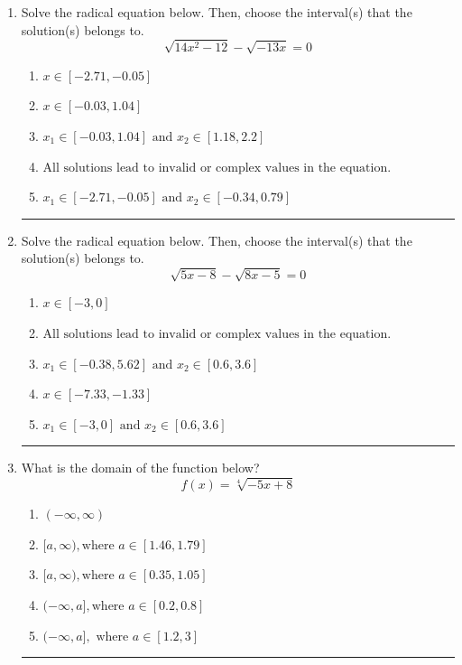 \documentclass[14pt]{extbook}
\newcommand{\litem}[1]{\item#1\hspace*{-1cm}\rule{\textwidth}{0.4pt}}
\begin{document}
\begin{enumerate}
{\begin{enumerate}[label=\Alph*.]
\end{enumerate} }
\litem{
Solve the radical equation below. Then, choose the interval(s) that the solution(s) belongs to.\[ \sqrt{14 x^2 - 12} - \sqrt{-13 x} = 0 \]\begin{enumerate}[label=\Alph*.]
\item \( x \in [-2.71,-0.05] \)
\item \( x \in [-0.03,1.04] \)
\item \( x_1 \in [-0.03, 1.04] \text{ and } x_2 \in [1.18,2.2] \)
\item \( \text{All solutions lead to invalid or complex values in the equation.} \)
\item \( x_1 \in [-2.71, -0.05] \text{ and } x_2 \in [-0.34,0.79] \)

\end{enumerate} }
\litem{
Solve the radical equation below. Then, choose the interval(s) that the solution(s) belongs to.\[ \sqrt{5 x - 8} - \sqrt{8 x - 5} = 0 \]\begin{enumerate}[label=\Alph*.]
\item \( x \in [-3,0] \)
\item \( \text{All solutions lead to invalid or complex values in the equation.} \)
\item \( x_1 \in [-0.38, 5.62] \text{ and } x_2 \in [0.6,3.6] \)
\item \( x \in [-7.33,-1.33] \)
\item \( x_1 \in [-3, 0] \text{ and } x_2 \in [0.6,3.6] \)

\end{enumerate} }
\litem{
What is the domain of the function below?\[ f(x) = \sqrt[4]{-5 x + 8} \]\begin{enumerate}[label=\Alph*.]
\item \( (-\infty, \infty) \)
\item \( [a, \infty), \text{where } a \in [1.46, 1.79] \)
\item \( [a, \infty), \text{where } a \in [0.35, 1.05] \)
\item \( (-\infty, a], \text{where } a \in [0.2, 0.8] \)
\item \( (-\infty, a], \text{ where } a \in [1.2, 3] \)


\end{enumerate}}
\end{enumerate}
\end{document}
